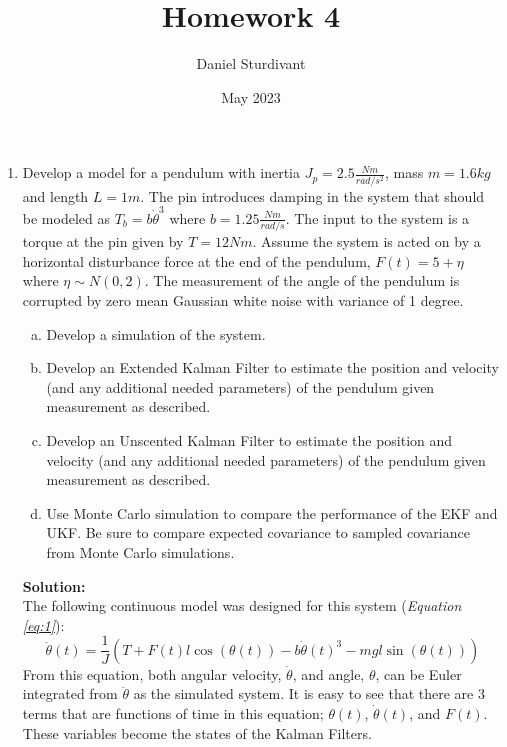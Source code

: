\documentclass[10pt]{article}
\author{Daniel Sturdivant}
\title{Homework 4}
\date{May 2023}
\newcommand{\solution}{\textbf{Solution: \\}}
\begin{document}
\maketitle
\thispagestyle{fancy}
\setlength{\parindent}{0pt}

\begin{enumerate}[label=\textbf{\arabic*.}]
  \itemsep 24pt
  
  \item Develop a model for a pendulum with inertia $J_p = 2.5 
  \frac{\si{Nm}}{\si{rad/s^2}}$, mass $m=1.6 \si{kg}$ and length $L = 1\si{m}$. 
  The pin introduces damping in the system that should be modeled as $T_b = b 
  \dot{\theta}^3$ where $b = 1.25 \frac{\si{Nm}}{\si{rad/s}}$. The input to the 
  system is a torque at the pin given by $T = 12 \si{Nm}$. Assume the system is 
  acted on by a horizontal disturbance force at the end of the pendulum,
  $F(t) = 5 + \eta$ where $\eta \sim N(0,2)$. The measurement of the angle of 
  the pendulum is corrupted by zero mean Gaussian white noise with variance of 1 
  degree.
  \begin{enumerate}[(a)]
    \itemsep -2pt 
    \item Develop a simulation of the system.
    \item Develop an Extended Kalman Filter to estimate the position and 
    velocity (and any additional needed parameters) of the pendulum given 
    measurement as described.
    \item Develop an Unscented Kalman Filter to estimate the position and 
    velocity (and any additional needed parameters) of the pendulum given 
    measurement as described.
    \item Use Monte Carlo simulation to compare the performance of the EKF and 
    UKF. Be sure to compare expected covariance to sampled covariance from 
    Monte Carlo simulations.
  \end{enumerate}
  \solution
  The following continuous model was designed for this system (\emph{Equation 
  \ref{eq:1}}):
  \begin{equation}
    \ddot{\theta}(t) = \dfrac{1}{J} \left(T + F(t)l\cos{(\theta(t))} - b\dot{\theta}(t)^3 - mgl\sin{(\theta(t))}\right)
    \label{eq:1}
  \end{equation}
  From this equation, both angular velocity, $\dot{\theta}$, and angle, 
  $\theta$, can be Euler integrated from $\ddot{\theta}$ as the simulated 
  system. It is easy to see that there are 3 terms that are functions of time in 
  this equation; $\theta(t)$, $\dot{\theta}(t)$, and $F(t)$. These variables 
  become the states of the Kalman Filters.


\end{enumerate}
\end{document}
